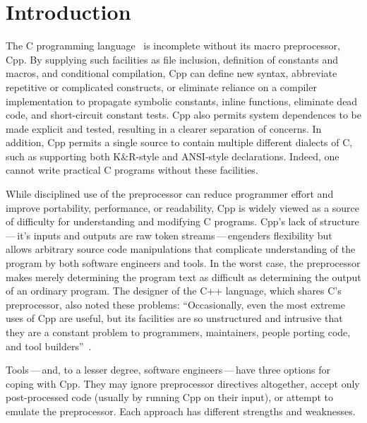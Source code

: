 \documentclass[10pt]{article}
\begin{document}
\bigskip

\section{Introduction}

The C programming language~\cite{KernighanR88,Harbison91} is incomplete
without its macro preprocessor, Cpp.  By supplying such facilities as file
inclusion, definition of constants and macros, and conditional compilation,
Cpp can define new syntax, abbreviate repetitive or complicated constructs,
or eliminate reliance on a compiler implementation to propagate symbolic
constants, inline functions, eliminate dead code, and short-circuit
constant tests.  Cpp also permits system dependences to be made explicit
and tested, resulting in a clearer separation of concerns.  In addition,
Cpp permits a single source to contain multiple different dialects of C,
such as supporting both K\&R-style and ANSI-style declarations.  Indeed,
one cannot write practical C programs without these facilities.

While disciplined use of the preprocessor can reduce programmer effort
and improve portability, performance, or readability, Cpp is widely
viewed as a source of difficulty for understanding and modifying C
programs.  Cpp's lack of structure\,---\,it's inputs and
outputs are raw token streams\,---\,engenders flexibility but allows
arbitrary source code manipulations that complicate 
understanding of the program by both software engineers and tools.  In
the worst case, the preprocessor makes merely determining the program
text as difficult as determining the output of an ordinary program.
The designer of the C++ language, which shares C's preprocessor, also noted these
problems: ``Occasionally, even the most extreme uses of Cpp are
useful, but its facilities are so unstructured and intrusive that they
are a constant problem to programmers, maintainers, people porting
code, and tool builders''~\cite[p.~424]{Stroustrup-DesignEvolution}.

Tools\,---\,and, to a lesser degree, software engineers\,---\,have
three options for coping with Cpp.  They may ignore preprocessor
directives altogether, accept only post-processed code (usually by
running Cpp on their input), or attempt to emulate the preprocessor.
Each approach has different strengths and weaknesses.
\end{document}

